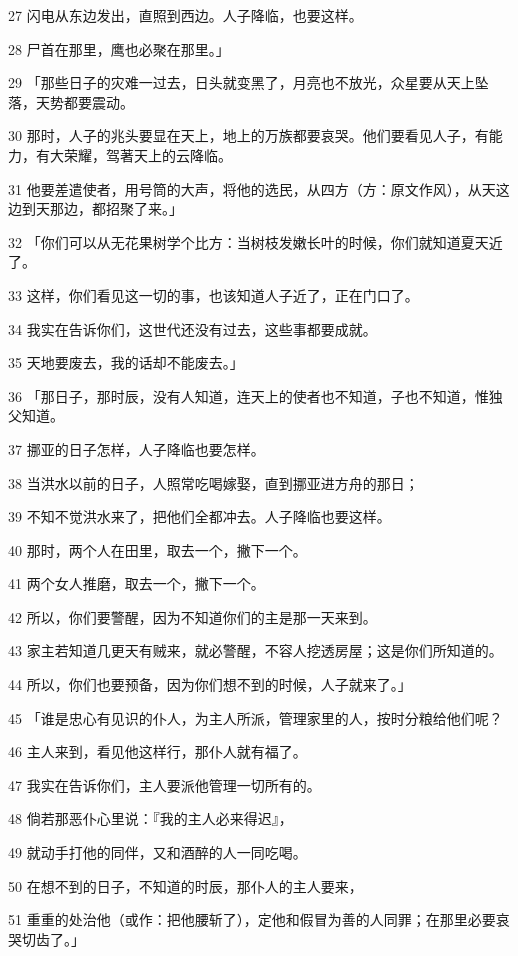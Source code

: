 \par 27 闪电从东边发出，直照到西边。人子降临，也要这样。
\par 28 尸首在那里，鹰也必聚在那里。」
\par 29 「那些日子的灾难一过去，日头就变黑了，月亮也不放光，众星要从天上坠落，天势都要震动。
\par 30 那时，人子的兆头要显在天上，地上的万族都要哀哭。他们要看见人子，有能力，有大荣耀，驾著天上的云降临。
\par 31 他要差遣使者，用号筒的大声，将他的选民，从四方（方：原文作风），从天这边到天那边，都招聚了来。」
\par 32 「你们可以从无花果树学个比方：当树枝发嫩长叶的时候，你们就知道夏天近了。
\par 33 这样，你们看见这一切的事，也该知道人子近了，正在门口了。
\par 34 我实在告诉你们，这世代还没有过去，这些事都要成就。
\par 35 天地要废去，我的话却不能废去。」
\par 36 「那日子，那时辰，没有人知道，连天上的使者也不知道，子也不知道，惟独父知道。
\par 37 挪亚的日子怎样，人子降临也要怎样。
\par 38 当洪水以前的日子，人照常吃喝嫁娶，直到挪亚进方舟的那日；
\par 39 不知不觉洪水来了，把他们全都冲去。人子降临也要这样。
\par 40 那时，两个人在田里，取去一个，撇下一个。
\par 41 两个女人推磨，取去一个，撇下一个。
\par 42 所以，你们要警醒，因为不知道你们的主是那一天来到。
\par 43 家主若知道几更天有贼来，就必警醒，不容人挖透房屋；这是你们所知道的。
\par 44 所以，你们也要预备，因为你们想不到的时候，人子就来了。」
\par 45 「谁是忠心有见识的仆人，为主人所派，管理家里的人，按时分粮给他们呢？
\par 46 主人来到，看见他这样行，那仆人就有福了。
\par 47 我实在告诉你们，主人要派他管理一切所有的。
\par 48 倘若那恶仆心里说：『我的主人必来得迟』，
\par 49 就动手打他的同伴，又和酒醉的人一同吃喝。
\par 50 在想不到的日子，不知道的时辰，那仆人的主人要来，
\par 51 重重的处治他（或作：把他腰斩了），定他和假冒为善的人同罪；在那里必要哀哭切齿了。」

